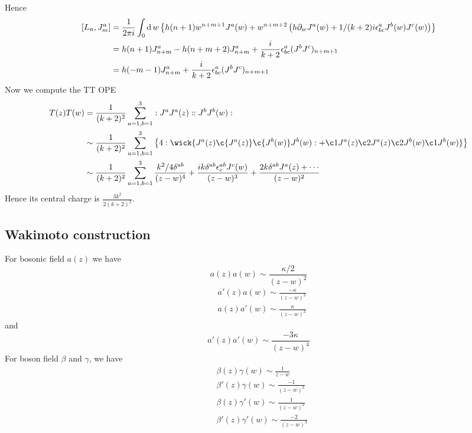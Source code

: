 Hence
\begin{equation}
	\begin{split}
	[L_n,J^a_m]&= \frac{1}{2\pi i}\int_0 \operatorname{d} w \left\{h(n+1) w^{n+m+1} J^a(w) + w^{n+m+2} \left(  h\partial_w J^a(w) + 1/(k+2) i \epsilon^a_{bc}J^b(w)J^c(w) \right) \right\}\\
	&= h(n+1) J^a_{n+m} -h(n+m+2) J^a_{n+m} + \frac{i}{k+2}\epsilon^a_{bc}(J^b J^c)_{n+m+1}\\
	& = h(-m-1)J^a_{n+m} + \frac{i}{k+2}\epsilon^a_{bc}(J^b J^c)_{n+m+1}
	\end{split}
\end{equation}
Now we compute the TT OPE 
\begin{equation}
\begin{split}
T(z)T(w)&= \frac{1}{(k+2)^2} \sum_{a=1,b=1}^3 :J^aJ^a(z)::J^bJ^b(w):\\
&\sim \frac{1}{(k+2)^2} \sum_{a=1,b=1}^3 \left\{4: \wick{J^a(z)\c{J^a(z)}\c{J^b(w)} J^b(w): + \c1{J^a(z)} \c2{J^a(z)} \c2{J^b(w)} \c1{J^b(w)}  } \right\} \\
&\sim \frac{1}{(k+2)^2} \sum_{a=1,b=1}^3 \frac{k^2/4 \delta^{ab}}{(z-w)^4} + \frac{ik \delta^{ab}\epsilon^{ab}_c J^c(w)}{(z-w)^3} + \frac{2k \delta^{ab}J^a(z) + \cdots}{(z-w)^2}
\end{split}
\end{equation}
Hence its central charge is $\frac{3k^2}{2(k+2)^2}$.
\subsection{Wakimoto construction}
For bosonic field $a(z)$ we have
\begin{equation}
	a(z)a(w) \sim \frac{\kappa/2}{(z-w)^2}
\end{equation}
\begin{eqnarray}
&a'(z)a(w) \sim  \frac{- \kappa}{(z-w)^3}\\
&a(z)a'(w) \sim \frac{\kappa}{(z-w)^3}
\end{eqnarray}
and 
\begin{equation}
	a'(z)a'(w) \sim \frac{-3\kappa}{(z-w)^4}
\end{equation}
For boson field $\beta$ and $\gamma$, we have
\begin{eqnarray}
	& \beta(z) \gamma(w) \sim \frac{1}{z-w} \\
	& \beta'(z) \gamma(w) \sim \frac{-1}{(z-w)^2}\\
	& \beta(z) \gamma'(w) \sim \frac{1}{(z-w)^2} \\
	& \beta'(z) \gamma'(w) \sim \frac{-2}{(z-w)^3} 
\end{eqnarray}
